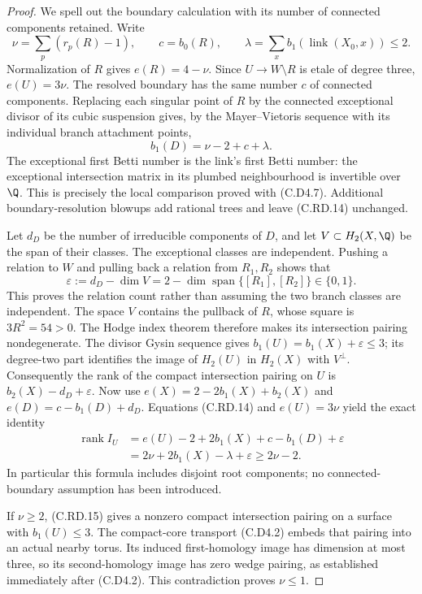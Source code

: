 \begin{proof}
We spell out the boundary calculation with its number
of connected components retained. Write
\[
 \nu=\sum_p(r_p(R)-1),\qquad
 c=b_0(R),\qquad
 \lambda=\sum_x b_1(\operatorname{link}(X_0,x))\le2.
\]
Normalization of $R$ gives $e(R)=4-\nu$.
Since $U\to W\setminus R$ is etale of degree three,
$e(U)=3\nu$. The resolved boundary has the same
number $c$ of connected components. Replacing each
singular point of $R$ by the connected exceptional
divisor of its cubic suspension gives, by the
Mayer--Vietoris sequence with its individual branch
attachment points,
\[
                 b_1(D)=\nu-2+c+\lambda.
\tag{C.RD.14}
\]
The exceptional first Betti number is the link's
first Betti number: the exceptional intersection
matrix in its plumbed neighbourhood is invertible
over $\Q$. This is precisely the local comparison
proved with (C.D4.7). Additional boundary-resolution
blowups add rational trees and leave (C.RD.14)
unchanged.

Let $d_D$ be the number of irreducible components
of $D$, and let $V\subset H_2(X,\Q)$ be the span
of their classes. The exceptional classes are
independent. Pushing a relation to $W$ and pulling
back a relation from $R_1,R_2$ shows that
\[
 \varepsilon:=d_D-\dim V
      =2-\dim\operatorname{span}\{[R_1],[R_2]\}
      \in\{0,1\}.
\]
This proves the relation count rather than
assuming the two branch classes are independent.
The space $V$ contains the pullback of $R$,
whose square is $3R^2=54>0$. The Hodge index
theorem therefore makes its intersection pairing
nondegenerate. The divisor Gysin sequence gives
$b_1(U)=b_1(X)+\varepsilon\le3$; its degree-two
part identifies the image of $H_2(U)$ in
$H_2(X)$ with $V^\perp$. Consequently the rank
of the compact intersection pairing on $U$ is
$b_2(X)-d_D+\varepsilon$.
Now use $e(X)=2-2b_1(X)+b_2(X)$ and
$e(D)=c-b_1(D)+d_D$. Equations (C.RD.14) and
$e(U)=3\nu$ yield the exact identity
\[
\begin{split}
 \operatorname{rank}I_U
   &=e(U)-2+2b_1(X)+c-b_1(D)+\varepsilon\\
   &=2\nu+2b_1(X)-\lambda+\varepsilon
     \ge2\nu-2.
\end{split}
\tag{C.RD.15}
\]
In particular this formula includes disjoint root
components; no connected-boundary assumption has
been introduced.

If $\nu\ge2$, (C.RD.15) gives a nonzero compact
intersection pairing on a surface with $b_1(U)\le3$.
The compact-core transport (C.D4.2) embeds that
pairing into an actual nearby torus. Its induced
first-homology image has dimension at most three,
so its second-homology image has zero wedge pairing,
as established immediately after (C.D4.2). This
contradiction proves $\nu\le1$.


\end{proof}
